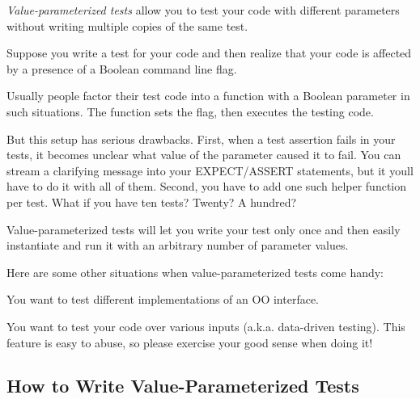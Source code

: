 {\itshape Value-\/parameterized tests} allow you to test your code with different parameters without writing multiple copies of the same test.

Suppose you write a test for your code and then realize that your code is affected by a presence of a Boolean command line flag.


\begin{DoxyCode}{0}
\DoxyCodeLine{\}}
\end{DoxyCode}


Usually people factor their test code into a function with a Boolean parameter in such situations. The function sets the flag, then executes the testing code.


\begin{DoxyCode}{0}
\DoxyCodeLine{\}}
\DoxyCodeLine{}
\DoxyCodeLine{\}}
\end{DoxyCode}


But this setup has serious drawbacks. First, when a test assertion fails in your tests, it becomes unclear what value of the parameter caused it to fail. You can stream a clarifying message into your {\ttfamily E\+X\+P\+E\+CT}/{\ttfamily A\+S\+S\+E\+RT} statements, but it you\textquotesingle{}ll have to do it with all of them. Second, you have to add one such helper function per test. What if you have ten tests? Twenty? A hundred?

Value-\/parameterized tests will let you write your test only once and then easily instantiate and run it with an arbitrary number of parameter values.

Here are some other situations when value-\/parameterized tests come handy\+:


\begin{DoxyItemize}
\item You want to test different implementations of an OO interface.
\item You want to test your code over various inputs (a.\+k.\+a. data-\/driven testing). This feature is easy to abuse, so please exercise your good sense when doing it!
\end{DoxyItemize}

\subsection*{How to Write Value-\/\+Parameterized Tests}

